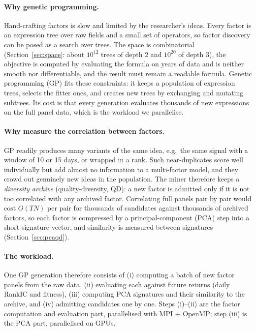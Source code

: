 \documentclass[11pt,a4paper]{article}
\begin{document}
\paragraph{Why genetic programming.} Hand-crafting factors is slow and limited by the researcher's ideas. Every factor is an expression tree over raw fields and a small set of operators, so factor discovery can be posed as a search over trees. The space is combinatorial (Section~\ref{sec:space}: about $10^{12}$ trees of depth 2 and $10^{20}$ of depth 3), the objective is computed by evaluating the formula on years of data and is neither smooth nor differentiable, and the result must remain a readable formula. Genetic programming (GP) fits these constraints: it keeps a population of expression trees, selects the fitter ones, and creates new trees by exchanging and mutating subtrees. Its cost is that every generation evaluates thousands of new expressions on the full panel data, which is the workload we parallelise.

\paragraph{Why measure the correlation between factors.} GP readily produces many variants of the same idea, e.g.\ the same signal with a window of 10 or 15 days, or wrapped in a rank. Such near-duplicates score well individually but add almost no information to a multi-factor model, and they crowd out genuinely new ideas in the population. The miner therefore keeps a \emph{diversity archive} (quality-diversity, QD): a new factor is admitted only if it is not too correlated with any archived factor. Correlating full panels pair by pair would cost $O(TN)$ per pair for thousands of candidates against thousands of archived factors, so each factor is compressed by a principal-component (PCA) step into a short signature vector, and similarity is measured between signatures (Section~\ref{sec:pcaqd}).

\paragraph{The workload.} One GP generation therefore consists of (i) computing a batch of new factor panels from the raw data, (ii) evaluating each against future returns (daily RankIC and fitness), (iii) computing PCA signatures and their similarity to the archive, and (iv) admitting candidates one by one. Steps (i)--(ii) are the factor computation and evaluation part, parallelised with MPI + OpenMP; step (iii) is the PCA part, parallelised on GPUs.
\end{document}
